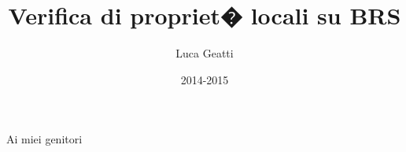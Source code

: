 \documentclass[11pt,UdineBachThesis,american,italian,draft]{PhdThesis}[2007/09/20]
\title{Verifica di propriet� locali su BRS}
\author{Luca Geatti}
\date{2014-2015}
\theoremstyle{mystyle}
\begin{document}
\pagestyle{empty}
\maketitle

\begin{dedication}
	Ai miei genitori
\end{dedication}

%


\frontmatter %
\pagestyle{serif}
\tableofcontents
\listoffigures


\mainmatter %








% 

\backmatter

\appendix

\backmatter %



\end{document}
